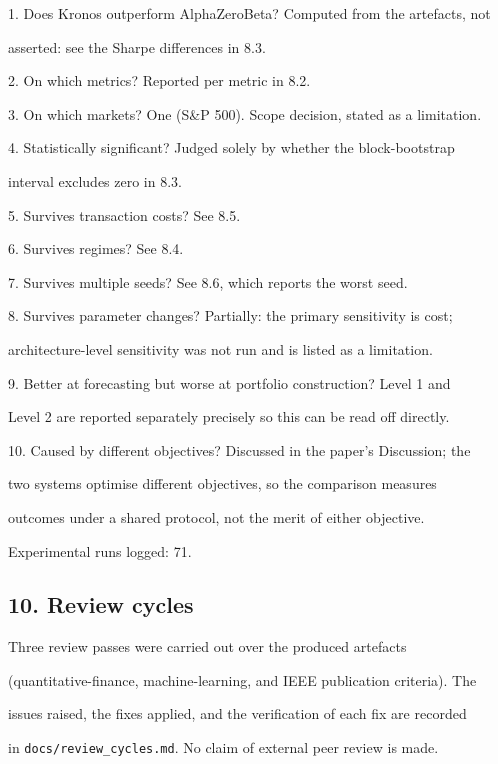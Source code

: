 1. Does Kronos outperform AlphaZeroBeta? Computed from the artefacts, not\par
   asserted: see the Sharpe differences in 8.3.\par
2. On which metrics? Reported per metric in 8.2.\par
3. On which markets? One (S\&P 500). Scope decision, stated as a limitation.\par
4. Statistically significant? Judged solely by whether the block-bootstrap\par
   interval excludes zero in 8.3.\par
5. Survives transaction costs? See 8.5.\par
6. Survives regimes? See 8.4.\par
7. Survives multiple seeds? See 8.6, which reports the worst seed.\par
8. Survives parameter changes? Partially: the primary sensitivity is cost;\par
   architecture-level sensitivity was not run and is listed as a limitation.\par
9. Better at forecasting but worse at portfolio construction? Level 1 and\par
   Level 2 are reported separately precisely so this can be read off directly.\par
10. Caused by different objectives? Discussed in the paper's Discussion; the\par
    two systems optimise different objectives, so the comparison measures\par
    outcomes under a shared protocol, not the merit of either objective.\par

Experimental runs logged: 71.\par

\subsection*{10. Review cycles}

Three review passes were carried out over the produced artefacts\par
(quantitative-finance, machine-learning, and IEEE publication criteria). The\par
issues raised, the fixes applied, and the verification of each fix are recorded\par
in \texttt{docs/review\_cycles.md}. No claim of external peer review is made.\par

